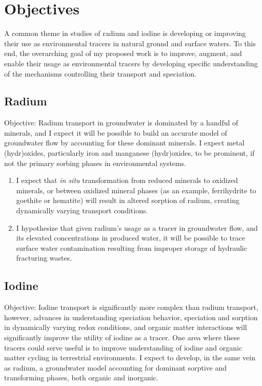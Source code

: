 \documentclass[twoside,12pt,titlepage]{article}
\begin{document}
\section{Objectives}

A common theme in studies of radium and iodine is developing or improving their use as environmental tracers in natural ground and surface waters. To this end, the overarching goal of my proposed work is to improve, augment, and enable their usage as environmental tracers by developing specific understanding of the mechanisms controlling their transport and speciation.
\subsection{Radium}

Objective: Radium transport in groundwater is dominated by a handful of minerals, and I expect it will be possible to build an accurate model of groundwater flow by accounting for these dominant minerals. I expect metal (hydr)oxides, particularly iron and manganese (hydr)oxides, to be prominent, if not the primary sorbing phases in environmental systems.

\begin{enumerate}[label=\arabic*)]
	\item I expect that \textit{in situ} transformation from reduced minerals to oxidized minerals, or between oxidized mineral phases (as an example, ferrihydrite to goethite or hematite) will result in altered sorption of radium, creating dynamically varying transport conditions.
	\item I hypothesize that given radium's usage as a tracer in groundwater flow, and its elevated concentrations in produced water, it will be possible to trace surface water contamination resulting from improper storage of hydraulic fracturing wastes.
\end{enumerate}

\subsection{Iodine}

Objective: Iodine transport is significantly more complex than radium transport, however, advances in understanding speciation behavior, speciation and sorption in dynamically varying redox conditions, and organic matter interactions will significantly improve the utility of iodine as a tracer. One area where these tracers could serve useful is to improve understanding of iodine and organic matter cycling in terrestrial environments. I expect to develop, in the same vein as radium, a groundwater model accounting for dominant sorptive and transforming phases, both organic and inorganic.
\end{document}
